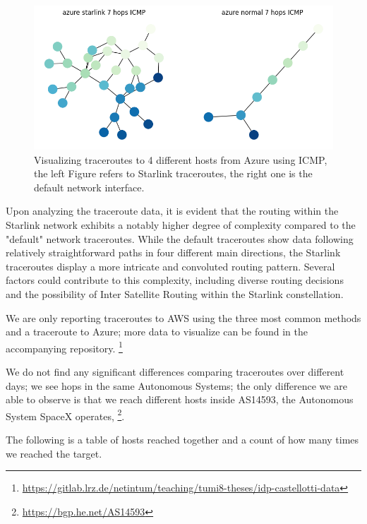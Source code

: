 \documentclass[IN,11pt,twoside,openright,idp,english]{tumthesis}
\begin{document}
\begin{figure}
    \label{fig:tr_azure_icmp}
    \centering
    \includegraphics[width=0.6\columnwidth]{img/tr_azure_icmp.png}
    \caption{Visualizing traceroutes to 4 different hosts from Azure using ICMP, the left Figure refers to Starlink traceroutes, the right one is the default network interface.}
\end{figure}
    
    
Upon analyzing the traceroute data, it is evident that the routing within the Starlink network exhibits a notably higher degree of complexity compared to the "default" network traceroutes. While the default traceroutes show data following relatively straightforward paths in four different main directions, the Starlink traceroutes display a more intricate and convoluted routing pattern. Several factors could contribute to this complexity, including diverse routing decisions and the possibility of Inter Satellite Routing within the Starlink constellation.

We are only reporting traceroutes to AWS using the three most common methods and a traceroute to Azure; more data to visualize can be found in the accompanying repository. \footnote{\url{https://gitlab.lrz.de/netintum/teaching/tumi8-theses/idp-castellotti-data}}
    
We do not find any significant differences comparing traceroutes over different days; we see hops in the same Autonomous Systems; the only difference we are able to observe is that we reach different hosts inside AS14593, the Autonomous System SpaceX operates, \footnote{\url{https://bgp.he.net/AS14593}}.
    
The following is a table of hosts reached together and a count of how many times we reached the target.
    
\end{document}
